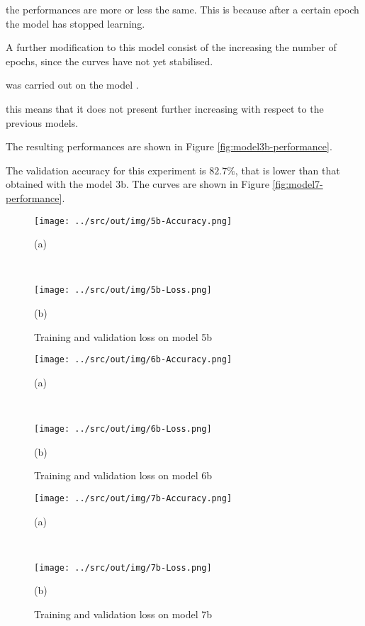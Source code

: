 \documentclass[a4paper,12pt]{article} %
\begin{document}
	the performances are more or less the same. 
	This is because after a certain epoch the model has stopped learning.
	
	A further modification to this model consist of the increasing the number 
	of epochs, since the curves have not yet stabilised. 

	was carried out on the model .
	
	this means that it does 
	not present further increasing with respect to the previous models.
	
	
	
	The resulting performances are shown in Figure 
	\ref{fig:model3b-performance}. 
	
		The validation accuracy for this experiment is $82.7\%$, that is lower 
		than 
	that obtained with the model 3b. The curves are shown in Figure 
	\ref{fig:model7-performance}.
	
	



	\begin{figure}[H]
		\begin{minipage}[c]{.49\textwidth}
			\centering
			\texttt{[image: ../src/out/img/5b-Accuracy.png]}
			\caption*{(a)}
		\end{minipage}
		~
		\begin{minipage}[c]{.49\textwidth}
			\centering
			\texttt{[image: ../src/out/img/5b-Loss.png]}
			\caption*{(b)}
		\end{minipage}
		\caption{Training and validation loss on model 5b}
		\label{fig:model5b-performance}
	\end{figure}

	\begin{figure}[H]
		\begin{minipage}[c]{.49\textwidth}
			\centering
			\texttt{[image: ../src/out/img/6b-Accuracy.png]}
			\caption*{(a)}
		\end{minipage}
		~
		\begin{minipage}[c]{.49\textwidth}
			\centering
			\texttt{[image: ../src/out/img/6b-Loss.png]}
			\caption*{(b)}
		\end{minipage}
		\caption{Training and validation loss on model 6b}
		\label{fig:model6b-performance}
	\end{figure}

	\begin{figure}[H]
		\begin{minipage}[c]{.49\textwidth}
			\centering
			\texttt{[image: ../src/out/img/7b-Accuracy.png]}
			\caption*{(a)}
		\end{minipage}
		~
		\begin{minipage}[c]{.49\textwidth}
			\centering
			\texttt{[image: ../src/out/img/7b-Loss.png]}
			\caption*{(b)}
		\end{minipage}
		\caption{Training and validation loss on model 7b}
		\label{fig:model7b-performance}
	\end{figure}
\end{document}
